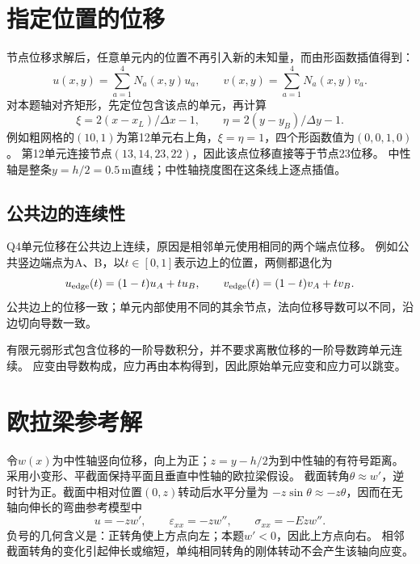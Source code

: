 \documentclass[UTF8,a4paper,fontset=fandol,10pt]{ctexart}
\begin{document}
\section{指定位置的位移}
节点位移求解后，任意单元内的位置不再引入新的未知量，而由形函数插值得到：
\begin{equation}
 u(x,y)=\sum_{a=1}^4N_a(x,y)u_a,\qquad
 v(x,y)=\sum_{a=1}^4N_a(x,y)v_a.
\end{equation}
对本题轴对齐矩形，先定位包含该点的单元，再计算
\[
\xi=2(x-x_L)/\Delta x-1,\qquad
\eta=2(y-y_B)/\Delta y-1.
\]
例如粗网格的$(10,1)$为第12单元右上角，$\xi=\eta=1$，四个形函数值为$(0,0,1,0)$。
第12单元连接节点$(13,14,23,22)$，因此该点位移直接等于节点23位移。
中性轴是整条$y=h/2=0.5\,\mathrm m$直线；中性轴挠度图在这条线上逐点插值。

\subsection{公共边的连续性}
Q4单元位移在公共边上连续，原因是相邻单元使用相同的两个端点位移。
例如公共竖边端点为A、B，以$t\in[0,1]$表示边上的位置，两侧都退化为
\[
u_{\rm edge}(t)=(1-t)u_A+tu_B,\qquad
v_{\rm edge}(t)=(1-t)v_A+tv_B.
\]
公共边上的位移一致；单元内部使用不同的其余节点，法向位移导数可以不同，沿边切向导数一致。

有限元弱形式包含位移的一阶导数积分，并不要求离散位移的一阶导数跨单元连续。
应变由导数构成，应力再由本构得到，因此原始单元应变和应力可以跳变。
\section{欧拉梁参考解}
令$w(x)$为中性轴竖向位移，向上为正；$z=y-h/2$为到中性轴的有符号距离。
采用小变形、平截面保持平面且垂直中性轴的欧拉梁假设。
截面转角$\theta\approx w'$，逆时针为正。截面中相对位置$(0,z)$转动后水平分量为
$-z\sin\theta\approx-z\theta$，因而在无轴向伸长的弯曲参考模型中
\begin{equation}
u=-zw',\qquad\varepsilon_{xx}=-zw'',\qquad\sigma_{xx}=-Ezw''.
\end{equation}
负号的几何含义是：正转角使上方点向左；本题$w'<0$，因此上方点向右。
相邻截面转角的变化引起伸长或缩短，单纯相同转角的刚体转动不会产生该轴向应变。
\end{document}
